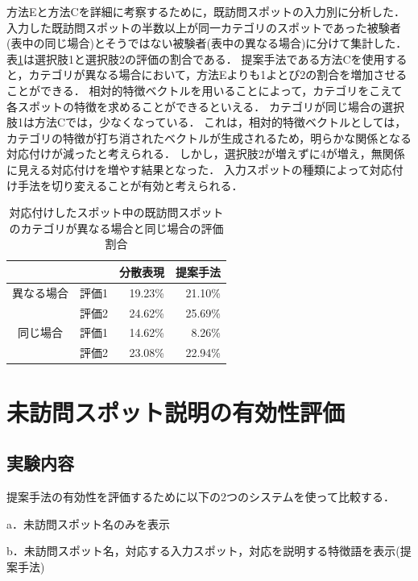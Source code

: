 \documentclass[submit]{ipsj}
\begin{document}
方法Eと方法Cを詳細に考察するために，既訪問スポットの入力別に分析した．
入力した既訪問スポットの半数以上が同一カテゴリのスポットであった被験者(表中の同じ場合)とそうではない被験者(表中の異なる場合)に分けて集計した．
表\ref{table:対応付けしたスポット中}は選択肢1と選択肢2の評価の割合である．
提案手法である方法Cを使用すると，カテゴリが異なる場合において，方法Eよりも1よとび2の割合を増加させることができる．
相対的特徴ベクトルを用いることによって，カテゴリをこえて各スポットの特徴を求めることができるといえる．
カテゴリが同じ場合の選択肢1は方法Cでは，少なくなっている．
これは，相対的特徴ベクトルとしては，カテゴリの特徴が打ち消されたベクトルが生成されるため，明らかな関係となる対応付けが減ったと考えられる．
しかし，選択肢2が増えずに4が増え，無関係に見える対応付けを増やす結果となった．
入力スポットの種類によって対応付け手法を切り変えることが有効と考えられる．

\begin{table}[t]
  \caption{対応付けしたスポット中の既訪問スポットのカテゴリが異なる場合と同じ場合の評価割合}
  \label{table:対応付けしたスポット中}
  \centering
  \begin{tabular}{c|c|r|r}
  \hline
  &     & \multicolumn{1}{c|}{分散表現} & \multicolumn{1}{c}{提案手法} \\ \hline
  異なる場合                 & 評価1 & 19.23\%                  & 21.10\%                 \\ \cline{2-4}
  & 評価2 & 24.62\%                  & 25.69\%                 \\ \hline
  同じ場合                  & 評価1 & 14.62\%                  & 8.26\%                  \\ \cline{2-4}
  \multicolumn{1}{l|}{} & 評価2 & 23.08\%                  & 22.94\%                 \\ \hline
  \end{tabular}
\end{table}

\section{未訪問スポット説明の有効性評価}
\label{sec:未訪問スポット説明の有効性評価}
\subsection{実験内容}
提案手法の有効性を評価するために以下の2つのシステムを使って比較する．
\begin{description}
  \item a．未訪問スポット名のみを表示
  \item b．未訪問スポット名，対応する入力スポット，対応を説明する特徴語を表示(提案手法)
\end{description}
\end{document}
